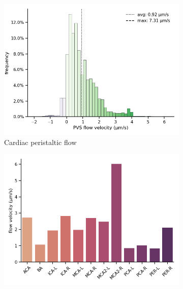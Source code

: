 \documentclass[fleqn,10pt]{wlscirep}
\begin{document}
\begin{figure}
\begin{subfigure}[b]{0.33\textwidth}
    \includegraphics[width =  \linewidth]{figures/cardiac_pvs_oscillation_velocity_histo_cell.png}
    \caption{Cardiac peristaltic flow}
    \end{subfigure}
    \begin{subfigure}[b]{0.33\textwidth}
    \centering
    \includegraphics[width =  \linewidth]{figures/cardiac_pvs_oscillation_arteries_labels_velocity.png}
    \end{subfigure}
    \begin{subfigure}[b]{0.33\textwidth}
    \centering

\end{subfigure}
\end{figure}
\end{document}
